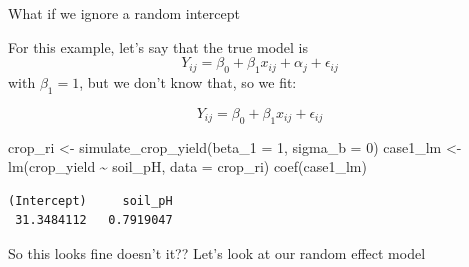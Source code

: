 \documentclass[
  ignorenonframetext,
  aspectratio=169,
]{beamer}
\newenvironment{Shaded}{\begin{snugshade}}{\end{snugshade}}
\newcommand{\AttributeTok}[1]{\textcolor[rgb]{0.40,0.45,0.13}{#1}}
\newcommand{\DecValTok}[1]{\textcolor[rgb]{0.68,0.00,0.00}{#1}}
\newcommand{\FunctionTok}[1]{\textcolor[rgb]{0.28,0.35,0.67}{#1}}
\newcommand{\NormalTok}[1]{\textcolor[rgb]{0.00,0.23,0.31}{#1}}
\newcommand{\OtherTok}[1]{\textcolor[rgb]{0.00,0.23,0.31}{#1}}
\newcommand{\SpecialCharTok}[1]{\textcolor[rgb]{0.37,0.37,0.37}{#1}}
\begin{document}
\begin{frame}[fragile]{What if we ignore a random intercept}
\label{what-if-we-ignore-a-random-intercept}
\center

For this example, let's say that the true model is\\
\[Y_{ij} = \beta_0 + \beta_1 x_{ij} + \alpha_j + \epsilon_{ij}\] with
\(\beta_1 = 1\), but we don't know that, so we fit:

\[Y_{ij} = \beta_0 + \beta_1 x_{ij} + \epsilon_{ij}\]

\begin{Shaded}
\begin{Highlighting}[]
\NormalTok{crop\_ri }\OtherTok{\textless{}{-}} \FunctionTok{simulate\_crop\_yield}\NormalTok{(}\AttributeTok{beta\_1 =} \DecValTok{1}\NormalTok{, }\AttributeTok{sigma\_b =} \DecValTok{0}\NormalTok{)}
\NormalTok{case1\_lm }\OtherTok{\textless{}{-}} \FunctionTok{lm}\NormalTok{(crop\_yield }\SpecialCharTok{\textasciitilde{}}\NormalTok{ soil\_pH, }\AttributeTok{data =}\NormalTok{ crop\_ri)}
\FunctionTok{coef}\NormalTok{(case1\_lm)}
\end{Highlighting}
\end{Shaded}

\begin{verbatim}
(Intercept)     soil_pH 
 31.3484112   0.7919047 
\end{verbatim}

\pause

\begin{center}
So this looks fine doesn't it?? Let's look at our random effect model
\end{center}
\end{frame}
\end{document}
